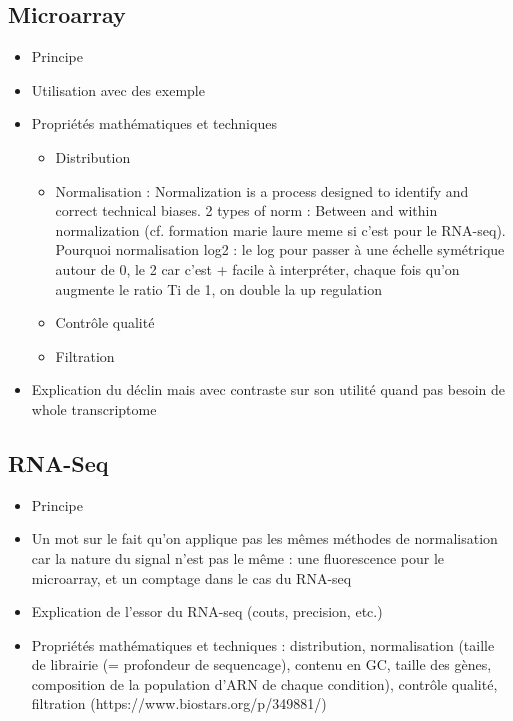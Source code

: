 \subsection{Microarray}
\begin{itemize}
\item Principe
\item Utilisation avec des exemple
\item Propriétés mathématiques et techniques
\begin{itemize}
    \item Distribution
    \item Normalisation : Normalization is a process designed to identify and correct
technical biases. 2 types of norm : Between and within normalization (cf. formation marie laure meme si c'est pour le RNA-seq). Pourquoi normalisation log2 : le log pour passer à une échelle symétrique autour de 0, le 2 car c'est + facile à interpréter, chaque fois qu'on augmente le ratio Ti de 1, on double la up regulation  %
    \item Contrôle qualité
    \item Filtration
\end{itemize}
\item Explication du déclin mais avec contraste sur son utilité quand pas besoin de whole transcriptome
\end{itemize}

\subsection{RNA-Seq}
\begin{itemize}
\item Principe
\item Un mot sur le fait qu'on applique pas les mêmes méthodes de normalisation car la nature du signal n'est pas le même : une fluorescence pour le microarray, et un comptage dans le cas du RNA-seq
\item Explication de l'essor du RNA-seq (couts, precision, etc.)
\item Propriétés mathématiques et techniques : distribution, normalisation (taille de librairie (= profondeur de sequencage), contenu en GC, taille des gènes, composition de la population d'ARN de chaque condition), contrôle qualité, filtration  (https://www.biostars.org/p/349881/)
\end{itemize}

